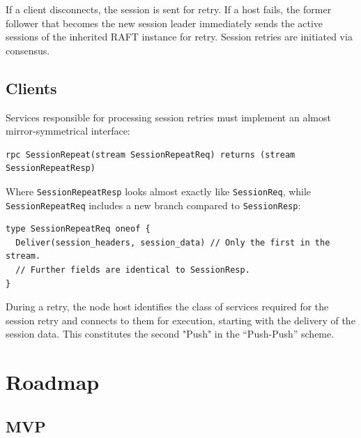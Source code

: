 \documentclass[a4paper,12pt]{article}
\begin{document}
    If a client disconnects, the session is sent for retry. If a host fails, the former follower that becomes the new session leader immediately sends the active sessions of the inherited RAFT instance for retry. Session retries are initiated via consensus.

    \subsection{Clients}

    Services responsible for processing session retries must implement an almost mirror-symmetrical interface:

    \begin{lstlisting}
rpc SessionRepeat(stream SessionRepeatReq) returns (stream SessionRepeatResp)
    \end{lstlisting}

    Where \texttt{SessionRepeatResp} looks almost exactly like \texttt{SessionReq}, while \texttt{SessionRepeatReq}
    includes a new branch compared to \texttt{SessionResp}:

    \begin{lstlisting}
type SessionRepeatReq oneof {
  Deliver(session_headers, session_data) // Only the first in the stream.
  // Further fields are identical to SessionResp.
}
    \end{lstlisting}

    During a retry, the node host identifies the class of services required for the session retry and connects to them for execution, starting with the delivery of the session data. This constitutes the second "Push" in the \enquote{Push-Push} scheme.

    \newpage


    \section{Roadmap}

    \subsection{MVP}
\end{document}
